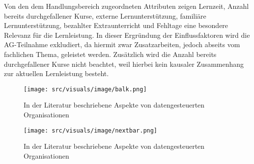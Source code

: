 Von den dem Handlungsbereich zugeordneten Attributen zeigen Lernzeit, Anzahl bereits durchgefallener Kurse, externe Lernunterstützung, familiäre Lernunterstützung, bezahlter Extraunterricht und Fehltage eine besondere Relevanz für die Lernleistung. 
In dieser Ergründung der Einflussfaktoren wird die AG-Teilnahme exkludiert, da hiermit zwar Zusatzarbeiten, jedoch abseits vom fachlichen Thema, geleistet werden.
Zusätzlich wird die Anzahl bereits durchgefallener Kurse nicht beachtet, weil hierbei kein kausaler Zusammenhang zur aktuellen Lernleistung besteht.

    

\begin{figure}[htb]
    \centering
    \texttt{[image: src/visuals/image/balk.png]}
    \caption{In der Literatur beschriebene Aspekte von datengesteuerten Organisationen}
    \label{fig:balks}
\end{figure}


\begin{figure}[htb]
    \centering
    \texttt{[image: src/visuals/image/nextbar.png]}
    \caption{In der Literatur beschriebene Aspekte von datengesteuerten Organisationen}
    \label{fig:nextbar}
\end{figure}